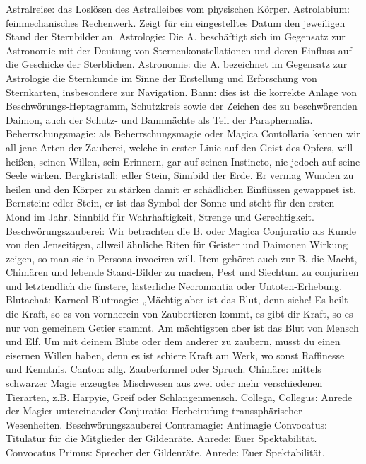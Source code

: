 \documentclass[a5paper,8pt]{book}
\begin{document}
Astralreise: das Loslösen des Astralleibes vom physischen Körper. 
Astrolabium: feinmechanisches Rechenwerk. Zeigt für ein eingestelltes Datum den jeweiligen Stand der Sternbilder an.
Astrologie: Die A. beschäftigt sich im Gegensatz zur \textit{}Astronomie mit der Deutung von Sternenkonstellationen und 
deren Einfluss auf die Geschicke der Sterblichen.
Astronomie: die A. bezeichnet im Gegensatz zur \textit{}Astrologie die Sternkunde im Sinne der Erstellung und Erforschung 
von Sternkarten, insbesondere zur Navigation.
Bann: dies ist die korrekte Anlage von Beschwörungs-Heptagramm, Schutzkreis sowie der Zeichen des zu beschwörenden Daimon, 
auch der Schutz- und Bannmächte als Teil der \textit{}Paraphernalia.
Beherrschungsmagie: als Beherrschungsmagie oder Magica Contollaria kennen wir all jene Arten der Zauberei, welche in erster 
Linie auf den Geist des Opfers, will heißen, seinen Willen, sein Erinnern, gar auf seinen Instincto, nie jedoch auf seine 
Seele wirken.
Bergkristall: edler Stein, Sinnbild der Erde. Er vermag Wunden zu heilen und den Körper zu stärken damit er schädlichen 
Einflüssen gewappnet ist.
Bernstein: edler Stein, er ist das Symbol der Sonne und steht für den ersten Mond im Jahr. Sinnbild für Wahrhaftigkeit, 
Strenge und Gerechtigkeit.
Beschwörungszauberei: Wir betrachten die B. oder Magica Conjuratio als Kunde von den Jenseitigen, allweil ähnliche Riten 
für \textit{}Geister und \textit{}Daimonen Wirkung zeigen, so man sie in Persona invociren will. Item gehöret auch zur B. 
die Macht, Chimären und lebende Stand-Bilder zu machen, Pest und Siechtum zu conjuriren und letztendlich die finstere, 
lästerliche \textit{}Necromantia oder Untoten-Erhebung.
Blutachat: \textit{}Karneol
Blutmagie: „Mächtig aber ist das Blut, denn siehe! Es heilt die Kraft, so es von vornherein von Zaubertieren kommt, es gibt dir Kraft, so es nur von gemeinem Getier stammt. Am mächtigsten aber ist das Blut von Mensch und Elf. Um mit deinem Blute oder dem anderer zu zaubern, musst du einen eisernen Willen haben, denn es ist schiere Kraft am Werk, wo sonst Raffinesse und Kenntnis.
Canton: allg. Zauberformel oder Spruch.
Chimäre: mittels schwarzer Magie erzeugtes Mischwesen aus zwei oder mehr verschiedenen Tierarten, z.B. Harpyie, Greif oder Schlangenmensch.
Collega, Collegus: Anrede der Magier untereinander
Conjuratio: Herbeirufung transsphärischer Wesenheiten. \textit{}Beschwörungszauberei
Contramagie: \textit{}Antimagie
Convocatus: Titulatur für die Mitglieder der Gildenräte. Anrede: Euer Spektabilität.
Convocatus Primus: Sprecher der Gildenräte. Anrede: Euer Spektabilität.
\end{document}
